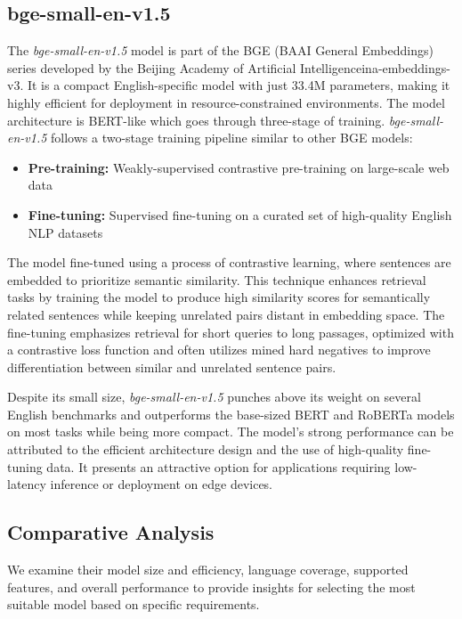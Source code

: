 \subsection{bge-small-en-v1.5}\label{subsec:baai}
The \textit{\textit{bge-small-en-v1.5}} model is part of the BGE (BAAI General Embeddings) series developed by the Beijing Academy of Artificial Intelligenceina-embeddings-v3.
It is a compact English-specific model with just 33.4M parameters, making it highly efficient for deployment in resource-constrained environments.
The model architecture is BERT-like which goes through three-stage of training.
\textit{\textit{bge-small-en-v1.5}} follows a two-stage training pipeline similar to other BGE models:
\begin{itemize}
    \item \textbf{Pre-training:} Weakly-supervised contrastive pre-training on large-scale web data
    \item \textbf{Fine-tuning:} Supervised fine-tuning on a curated set of high-quality English NLP datasets
\end{itemize}

The model fine-tuned using a process of contrastive learning, where sentences are embedded to prioritize semantic similarity.
This technique enhances retrieval tasks by training the model to produce high similarity scores for semantically related sentences while keeping unrelated pairs distant in embedding space.
The fine-tuning emphasizes retrieval for short queries to long passages, optimized with a contrastive loss function and often utilizes mined hard negatives to improve differentiation between similar and unrelated sentence pairs.

Despite its small size, \textit{\textit{bge-small-en-v1.5}} punches above its weight on several English benchmarks and outperforms the base-sized BERT and RoBERTa models on most tasks while being more compact.
The model's strong performance can be attributed to the efficient architecture design and the use of high-quality fine-tuning data.
It presents an attractive option for applications requiring low-latency inference or deployment on edge devices.

\subsection{Comparative Analysis}\label{subsec:comparative-analysis}
We examine their model size and efficiency, language coverage, supported features, and overall performance to provide insights for selecting the most suitable model based on specific requirements.

